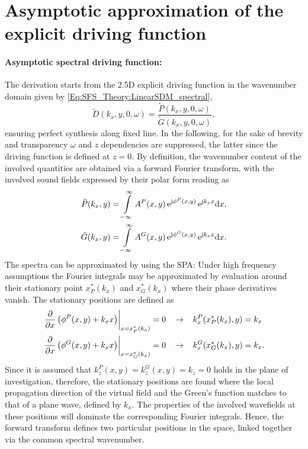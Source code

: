 \section{Asymptotic approximation of the explicit driving function}
\label{App:SDM_SPA}

\paragraph{Asymptotic spectral driving function:}
The derivation starts from the 2.5D explicit driving function in the wavenumber domain given by \eqref{Eq:SFS_Theory:LinearSDM_spectral},
\begin{equation}
\tilde{D}(k_x,y,0,\omega) = \frac{\tilde{P}(k_x,y,0, \omega)}{\tilde{G}(k_x,y,0, \omega)},
\end{equation}
ensuring perfect synthesis along fixed line.
In the following, for the sake of brevity and transparency $\omega$ and $z$ dependencies are suppressed, the latter since the driving function is defined at $z=0$.
By definition, the wavenumber content of the involved quantities are obtained via a forward Fourier transform, with the involved sound fields expressed by their polar form reading as
\begin{align} 
\tilde{P}(k_x,y) = \int\limits_{-\infty}^{\infty} A^P(x,y) \, \mathrm{e}^{\mathrm{j} \phi^P(x,y)} \, \mathrm{e}^{\mathrm{j} k_x x} \mathrm{d} x, \\
\tilde{G}(k_x,y) = \int\limits_{-\infty}^{\infty} A^G(x,y) \, \mathrm{e}^{\mathrm{j} \phi^G(x,y)} \, \mathrm{e}^{\mathrm{j} k_x x} \mathrm{d} x.
\end{align}
The spectra can be approximated by using the SPA:
Under high frequency assumptions the Fourier integrals may be approximated by evaluation around their stationary point $x^*_P(k_x)$ and $x^*_G(k_x)$ where their phase derivatives vanish. 
The stationary positions are defined as
\begin{align}	
\label{eq:xP_xG_in_spatial_domain}
\left. \frac{\partial}{\partial x} \left(  \phi^P(x,y) + k_x x \right )\right|_{x = x^*_P(k_x)} = 0
\hspace{3mm} &\rightarrow \hspace{3mm}
k_x^P(x^*_P(k_x),y) = k_x \nonumber
\\ 
\left. \frac{\partial}{\partial x} \left( \phi^G(x,y) + k_x x \right )\right|_{x = x^*_G(k_x)} = 0
\hspace{3mm} &\rightarrow \hspace{3mm}
k_x^G(x^*_G(k_x),y) = k_x.
\end{align}
Since it is assumed that $k_z^P(x,y) = k_z^G(x,y) = k_z = 0$ holds in the plane of investigation, therefore, the stationary positions are found where the local propagation direction of the virtual field and the Green's function matches to that of a plane wave, defined by $k_x$.
The properties of the involved wavefields at these positions will dominate the corresponding Fourier integrals.
Hence, the forward transform defines two particular positions in the space, linked together via the common spectral wavenumber.

